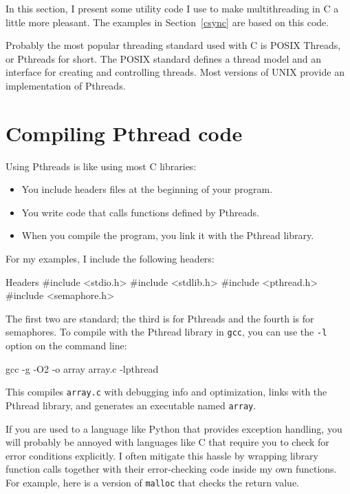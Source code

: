 
In this section, I present some utility code I use to make
multithreading in C a little more pleasant.  The examples in
Section~\ref{csync} are based on this code.

Probably the most popular threading standard used with C is
POSIX Threads, or Pthreads for short.  The POSIX standard defines
a thread model and an interface for creating and controlling
threads.  Most versions of UNIX provide an implementation of
Pthreads.

\section{Compiling Pthread code}

Using Pthreads is like using most C libraries:

\begin{itemize}

\item You include headers files at the beginning of your
program.

\item You write code that calls functions defined by Pthreads.

\item When you compile the program, you link it with the
Pthread library.

\end{itemize}

For my examples, I include the following headers:

\begin{lstbox}{Headers}
#include <stdio.h>
#include <stdlib.h>
#include <pthread.h>
#include <semaphore.h>
\end{lstbox}

The first two are standard; the third is for Pthreads and
the fourth is for semaphores.
To compile with the Pthread library in {\tt gcc}, you
can use the {\tt -l}
option on the command line:

\begin{lstbox}{}
gcc -g -O2 -o array array.c -lpthread
\end{lstbox}

This compiles {\tt array.c} with debugging info and optimization,
links with the Pthread library, and generates an executable
named {\tt array}.

If you are used to a language like Python that provides exception
handling, you will probably be annoyed with languages like C that
require you to check for error conditions explicitly.  I often
mitigate this hassle by wrapping library function calls
together with their error-checking code inside my own functions.
For example, here is a version of {\tt malloc}
that checks the return value.

